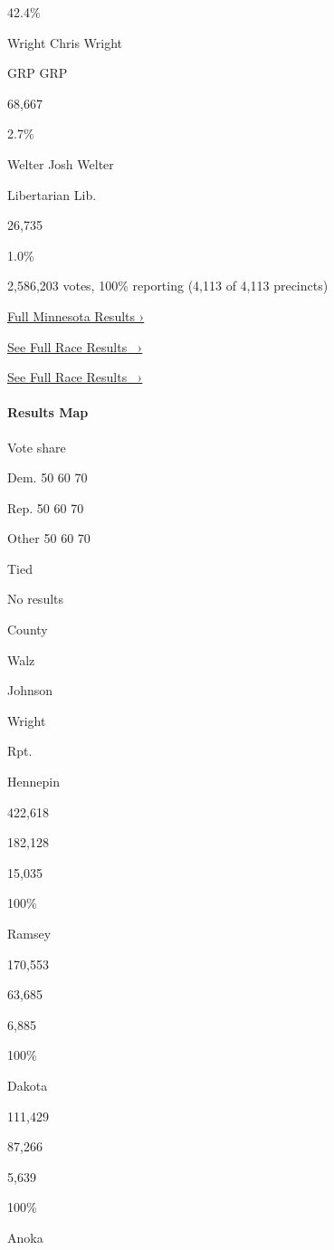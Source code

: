 42.4\%

 Wright Chris Wright

GRP GRP

68,667

2.7\%

 Welter Josh Welter

Libertarian Lib.

26,735

1.0\%

2,586,203 votes, 100\% reporting (4,113 of 4,113 precincts)

\href{https://www.nytimes3xbfgragh.onion/interactive/2018/11/06/us/elections/results-minnesota-elections.html}{Full
Minnesota Results ›}

\href{https://www.nytimes3xbfgragh.onion/elections/results/minnesota-governor}{See
Full Race Results~ ›}

\href{https://www.nytimes3xbfgragh.onion/elections/results/minnesota-governor}{See
Full Race Results~ ›}

\hypertarget{results-map-2}{%
\paragraph{Results Map}\label{results-map-2}}

Vote share

Dem. 50 60 70

Rep. 50 60 70

Other 50 60 70

Tied

No results

County

Walz

Johnson

Wright

Rpt.

Hennepin

422,618

182,128

15,035

100\%

Ramsey

170,553

63,685

6,885

100\%

Dakota

111,429

87,266

5,639

100\%

Anoka

